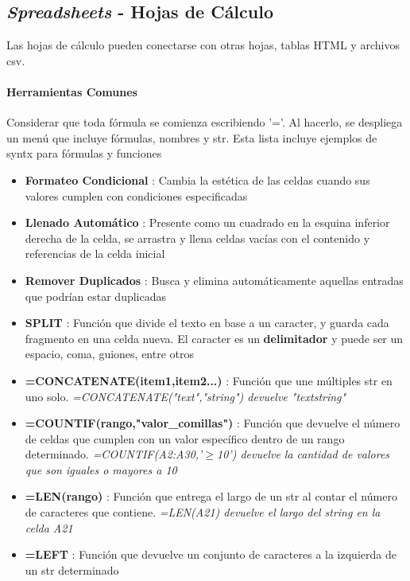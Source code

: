 
\subsection{\textit{Spreadsheets} - Hojas de Cálculo}
Las hojas de cálculo pueden conectarse con otras hojas, tablas HTML y archivos \gls{csv}.

\paragraph{Herramientas Comunes}
Considerar que toda fórmula se comienza escribiendo '='. Al hacerlo, se despliega un menú que incluye fórmulas, nombres y \gls{str}. Esta lista incluye ejemplos de \gls{syntx} para fórmulas y funciones
\begin{itemize}
    \item {\textbf{Formateo Condicional} : Cambia la estética de las celdas cuando sus valores cumplen con condiciones especificadas}
    \item {\textbf{Llenado Automático} : Presente como un cuadrado en la esquina inferior derecha de la celda, se arrastra y llena celdas vacías con el contenido y referencias de la celda inicial}
    \item {\textbf{Remover Duplicados} : Busca y elimina automáticamente aquellas entradas que podrían estar duplicadas} 
    \item {\textbf{SPLIT} : Función que divide el texto en base a un caracter, y guarda cada fragmento en una celda nueva. El caracter es un \textbf{delimitador} y puede ser un espacio, coma, guiones, entre otros}
    \item {\textbf{=CONCATENATE(item1,item2...)} : Función que une múltiples \gls{str} en uno solo. \textit{=CONCATENATE("text","string") devuelve "textstring"}}
    \item {\textbf{=COUNTIF(rango,"valor\_comillas")} : Función que devuelve el número de celdas que cumplen con un valor específico dentro de un rango determinado. \textit{=COUNTIF(A2:A30,'${\geq}$10') devuelve la cantidad de valores que son iguales o mayores a 10}}
    \item {\textbf{=LEN(rango)} : Función que entrega el largo de un \gls{str} al contar el número de caracteres que contiene. \textit{=LEN(A21) devuelve el largo del string en la celda A21}}
    \item {\textbf{=LEFT} : Función que devuelve un conjunto de caracteres a la izquierda de un \gls{str} determinado}

\end{itemize}
